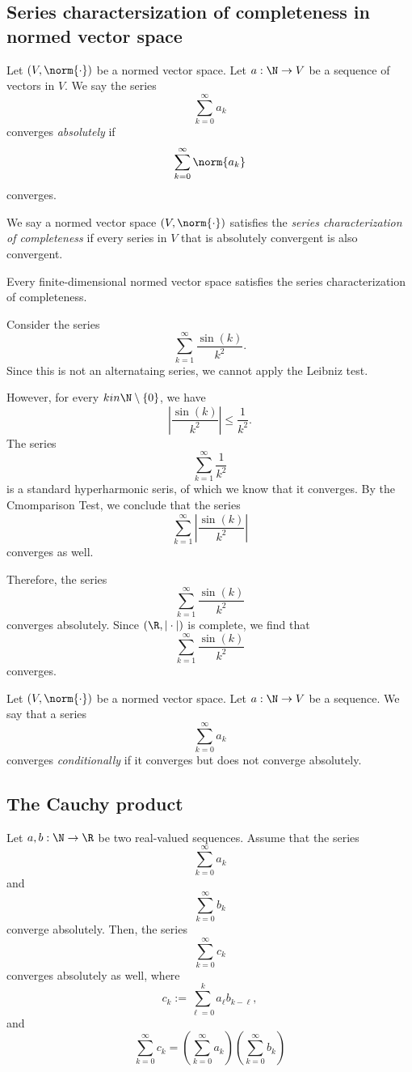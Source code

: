 \subsection{Series charactersization of completeness in normed vector space}
\begin{definition}
    Let $(V, \norm{\cdot})$ be a normed vector space. Let $a: \N \to V$ be a sequence of vectors in $V$. We say the series
    $$\sum_{k=0}^\infty a_k$$
    converges \emph{absolutely} if
    $$\sum_{k=0}^\infty \norm{a_k}$$
    converges.
\end{definition}

\begin{definition}
    We say a normed vector space $(V, \norm{\cdot})$ satisfies the \emph{series characterization of completeness} if every series in $V$ that is absolutely convergent is also convergent.
\end{definition}

\begin{proposition}
    Every finite-dimensional normed vector space satisfies the series characterization of completeness.
\end{proposition}
\begin{example}
    Consider the series 
    $$\sum_{k=1}^\infty \frac{\sin(k)}{k^2}.$$
    Since this is not an alternataing series, we cannot apply the Leibniz test. 

    However, for every $k \\in \N \setminus \{0\}$, we have
    $$\left| \frac{\sin(k)}{k^2}\right| \le \frac{1}{k^2}.$$
    The series
    $$\sum_{k=1}^\infty \frac{1}{k^2}$$
    is a standard hyperharmonic seris, of which we know that it converges. By the Cmomparison Test, we conclude that the series
    $$\sum_{k=1}^\infty \left|\frac{\sin(k)}{k^2}\right|$$
    converges as well.

    Therefore, the series 
    $$\sum_{k=1}^\infty \frac{\sin(k)}{k^2}$$
    converges absolutely. Since $(\R, | \cdot |)$ is complete, we find that
    $$\sum_{k=1}^\infty \frac{\sin(k)}{k^2}$$
    converges.
\end{example}

\begin{definition}
        Let $(V, \norm{\cdot})$ be a normed vector space. Let $a: \N \to V$ be a sequence. We say that a series
        $$\sum_{k=0}^\infty a_k$$
        converges \emph{conditionally} if it converges but does not converge absolutely.
\end{definition}

\subsection{The Cauchy product}
\begin{theorem}
    Let $a,b: \N \to \R$ be two real-valued sequences. Assume that the series
    $$\sum_{k=0}^\infty a_k$$
    and
    $$\sum_{k=0}^\infty b_k$$
    converge absolutely. Then, the series
    $$\sum_{k=0}^\infty c_k$$
    converges absolutely as well, where 
    $$c_k := \sum_{\ell = 0}^k a_\ell b_{k-\ell},$$ and
    $$\sum_{k=0}^\infty c_k = \left(\sum_{k=0}^\infty a_k\right)\left(\sum_{k=0}^\infty b_k\right)$$
\end{theorem}
